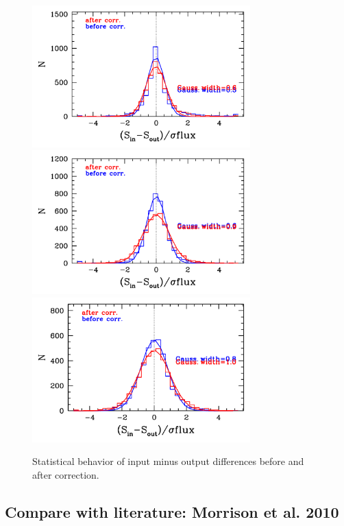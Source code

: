\documentclass[11pt,a4paper]{article}
\begin{document}
\begin{figure}[H]
	\includegraphics[width=0.75\textwidth]{galsim_20cm_Glenn_hist_dfcorr_1}
	\includegraphics[width=0.75\textwidth]{galsim_20cm_Glenn_hist_dfcorr_2}
	\includegraphics[width=0.75\textwidth]{galsim_20cm_Glenn_hist_dfcorr_3}
	\caption{Statistical behavior of input minus output differences before and after correction.}
\end{figure}

\subsection{Compare with literature: Morrison et al. 2010}
\end{document}
